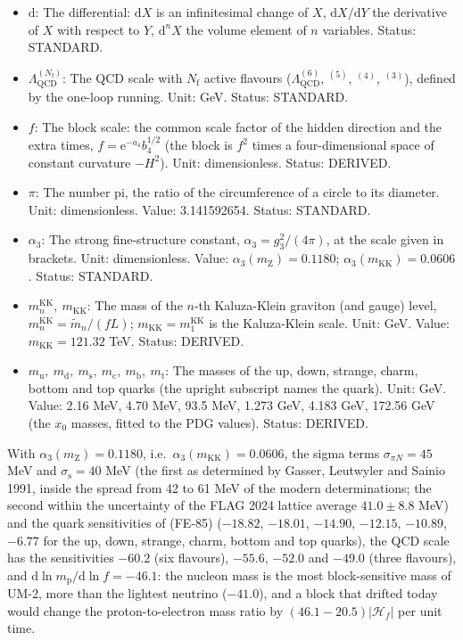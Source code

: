 \documentclass[
  10pt,
]{article}
\providecommand{\tightlist}{%
  \setlength{\itemsep}{0pt}\setlength{\parskip}{0pt}}
\begin{document}
\begin{itemize}
\tightlist
\item
  \(\mathrm{d}\): The differential: \(\mathrm{d}X\) is an infinitesimal
  change of \(X\), \(\mathrm{d}X/\mathrm{d}Y\) the derivative of \(X\)
  with respect to \(Y\), \(\mathrm{d}^nX\) the volume element of \(n\)
  variables. Status: STANDARD.
\item
  \(\Lambda_{\mathrm{QCD}}^{(N_{\mathrm{f}})}\): The QCD scale with
  \(N_{\mathrm{f}}\) active flavours (\(\Lambda_{\mathrm{QCD}}^{(6)}\),
  \(^{(5)}\), \(^{(4)}\), \(^{(3)}\)), defined by the one-loop running.
  Unit: GeV. Status: STANDARD.
\item
  \(f\): The block scale: the common scale factor of the hidden
  direction and the extra times, \(f = \mathrm{e}^{-a_4}b_4^{1/2}\) (the
  block is \(f^2\) times a four-dimensional space of constant curvature
  \(-H^2\)). Unit: dimensionless. Status: DERIVED.
\item
  \(\pi\): The number pi, the ratio of the circumference of a circle to
  its diameter. Unit: dimensionless. Value: 3.141592654. Status:
  STANDARD.
\item
  \(\alpha_3\): The strong fine-structure constant,
  \(\alpha_3 = g_3^2/(4\pi)\), at the scale given in brackets. Unit:
  dimensionless. Value: \(\alpha_3(m_{\mathrm{Z}}) = 0.1180\);
  \(\alpha_3(m_{\mathrm{KK}}) = 0.0606\). Status: STANDARD.
\item
  \(m^{\mathrm{KK}}_n,\ m_{\mathrm{KK}}\): The mass of the \(n\)-th
  Kaluza-Klein graviton (and gauge) level,
  \(m^{\mathrm{KK}}_n = \tilde m_n/(fL)\);
  \(m_{\mathrm{KK}} = m^{\mathrm{KK}}_1\) is the Kaluza-Klein scale.
  Unit: GeV. Value: \(m_{\mathrm{KK}} = 121.32\) TeV. Status: DERIVED.
\item
  \(m_{\mathrm{u}},\ m_{\mathrm{d}},\ m_{\mathrm{s}},\ m_{\mathrm{c}},\ m_{\mathrm{b}},\ m_{\mathrm{t}}\):
  The masses of the up, down, strange, charm, bottom and top quarks (the
  upright subscript names the quark). Unit: GeV. Value: 2.16 MeV, 4.70
  MeV, 93.5 MeV, 1.273 GeV, 4.183 GeV, 172.56 GeV (the \(x_0\) masses,
  fitted to the PDG values). Status: DERIVED.
\end{itemize}

With \(\alpha_3(m_{\mathrm{Z}}) = 0.1180\),
i.e.~\(\alpha_3(m_{\mathrm{KK}}) = 0.0606\), the sigma terms
\(\sigma_{\pi N} = 45\) MeV and \(\sigma_{\mathrm{s}} = 40\) MeV (the
first as determined by Gasser, Leutwyler and Sainio 1991, inside the
spread from 42 to 61 MeV of the modern determinations; the second within
the uncertainty of the FLAG 2024 lattice average \(41.0 \pm 8.8\) MeV)
and the quark sensitivities of (FE-85) (\(-18.82\), \(-18.01\),
\(-14.90\), \(-12.15\), \(-10.89\), \(-6.77\) for the up, down, strange,
charm, bottom and top quarks), the QCD scale has the sensitivities
\(-60.2\) (six flavours), \(-55.6\), \(-52.0\) and \(-49.0\) (three
flavours), and \(\mathrm{d}\ln m_{\mathrm{p}}/\mathrm{d}\ln f = -46.1\):
the nucleon mass is the most block-sensitive mass of UM-2, more than the
lightest neutrino (\(-41.0\)), and a block that drifted today would
change the proton-to-electron mass ratio by
\((46.1 - 20.5)\lvert\mathcal{H}_f\rvert\) per unit time.
\end{document}
